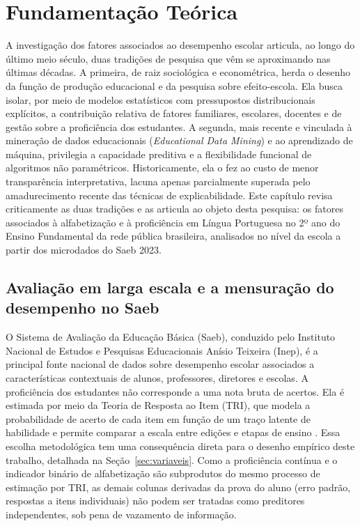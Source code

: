 \chapter{Fundamentação Teórica}

A investigação dos fatores associados ao desempenho escolar articula, ao
longo do último meio século, duas tradições de pesquisa que vêm se
aproximando nas últimas décadas. A primeira, de raiz sociológica e
econométrica, herda o desenho da função de produção educacional e da
pesquisa sobre efeito-escola. Ela busca isolar, por meio de modelos
estatísticos com pressupostos distribucionais explícitos, a contribuição
relativa de fatores familiares, escolares, docentes e de gestão sobre a
proficiência dos estudantes. A segunda, mais recente e vinculada à
mineração de dados educacionais (\textit{Educational Data Mining}) e ao
aprendizado de máquina, privilegia a capacidade preditiva e a flexibilidade
funcional de algoritmos não paramétricos. Historicamente, ela o fez ao
custo de menor transparência interpretativa, lacuna apenas parcialmente
superada pelo amadurecimento recente das técnicas de explicabilidade. Este
capítulo revisa criticamente as duas tradições e as articula ao objeto
desta pesquisa: os fatores associados à alfabetização e à proficiência em
Língua Portuguesa no 2º ano do Ensino Fundamental da rede pública
brasileira, analisados no nível da escola a partir dos microdados do Saeb
2023.

\section{Avaliação em larga escala e a mensuração do desempenho no Saeb}

O Sistema de Avaliação da Educação Básica (Saeb), conduzido pelo Instituto
Nacional de Estudos e Pesquisas Educacionais Anísio Teixeira (Inep), é a
principal fonte nacional de dados sobre desempenho escolar associados a
características contextuais de alunos, professores, diretores e escolas. A
proficiência dos estudantes não corresponde a uma nota bruta de acertos.
Ela é estimada por meio da Teoria de Resposta ao Item (TRI), que modela a
probabilidade de acerto de cada item em função de um traço latente de
habilidade e permite comparar a escala entre edições e etapas de ensino
\cite{klein2003tri}. Essa escolha metodológica tem uma consequência direta
para o desenho empírico deste trabalho, detalhada na
Seção~\ref{sec:variaveis}. Como a proficiência contínua e o indicador
binário de alfabetização são subprodutos do mesmo processo de estimação
por TRI, as demais colunas derivadas da prova do aluno (erro padrão,
respostas a itens individuais) não podem ser tratadas como preditores
independentes, sob pena de vazamento de informação.

